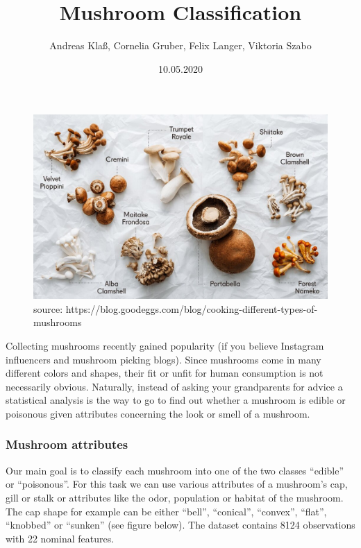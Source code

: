 \documentclass[
]{article}
\title{Mushroom Classification}
\author{Andreas Klaß, Cornelia Gruber, Felix Langer, Viktoria Szabo}
\date{10.05.2020}
\begin{document}
\maketitle

\begin{figure}

{\centering \includegraphics[width=1\linewidth]{images/mushrooms1} 

}

\caption{source: https://blog.goodeggs.com/blog/cooking-different-types-of-mushrooms}\label{fig:unnamed-chunk-1}
\end{figure}

Collecting mushrooms recently gained popularity (if you believe
Instagram influencers and mushroom picking blogs). Since mushrooms come
in many different colors and shapes, their fit or unfit for human
consumption is not necessarily obvious. Naturally, instead of asking
your grandparents for advice a statistical analysis is the way to go to
find out whether a mushroom is edible or poisonous given attributes
concerning the look or smell of a mushroom.

\hypertarget{mushroom-attributes}{%
\subsubsection{Mushroom attributes}\label{mushroom-attributes}}

Our main goal is to classify each mushroom into one of the two classes
``edible'' or ``poisonous''. For this task we can use various attributes
of a mushroom's cap, gill or stalk or attributes like the odor,
population or habitat of the mushroom. The cap shape for example can be
either ``bell'', ``conical'', ``convex'', ``flat'', ``knobbed'' or
``sunken'' (see figure below). The dataset contains 8124 observations
with 22 nominal features.
\end{document}
